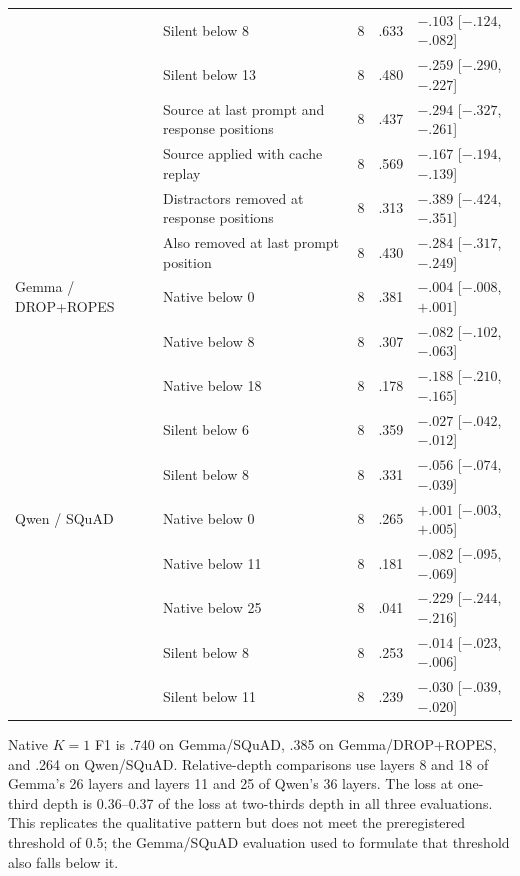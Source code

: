 \begin{table}[t]
\begin{tabular}{@{}llrrl@{}}
& Silent below 8 & 8 & .633 & $-.103$ [$-.124$, $-.082$] \\
& Silent below 13 & 8 & .480 & $-.259$ [$-.290$, $-.227$] \\
& Source at last prompt and response positions & 8 & .437 & $-.294$ [$-.327$, $-.261$] \\
& Source applied with cache replay & 8 & .569 & $-.167$ [$-.194$, $-.139$] \\
& Distractors removed at response positions & 8 & .313 & $-.389$ [$-.424$, $-.351$] \\
& Also removed at last prompt position & 8 & .430 & $-.284$ [$-.317$, $-.249$] \\
\midrule
Gemma / DROP+ROPES & Native below 0 & 8 & .381 & $-.004$ [$-.008$, $+.001$] \\
& Native below 8 & 8 & .307 & $-.082$ [$-.102$, $-.063$] \\
& Native below 18 & 8 & .178 & $-.188$ [$-.210$, $-.165$] \\
& Silent below 6 & 8 & .359 & $-.027$ [$-.042$, $-.012$] \\
& Silent below 8 & 8 & .331 & $-.056$ [$-.074$, $-.039$] \\
\midrule
Qwen / SQuAD & Native below 0 & 8 & .265 & $+.001$ [$-.003$, $+.005$] \\
& Native below 11 & 8 & .181 & $-.082$ [$-.095$, $-.069$] \\
& Native below 25 & 8 & .041 & $-.229$ [$-.244$, $-.216$] \\
& Silent below 8 & 8 & .253 & $-.014$ [$-.023$, $-.006$] \\
& Silent below 11 & 8 & .239 & $-.030$ [$-.039$, $-.020$] \\
\bottomrule
\end{tabular}
\end{table}

Native $K=1$ F1 is .740 on Gemma/SQuAD, .385 on Gemma/DROP+ROPES,
and .264 on Qwen/SQuAD. Relative-depth comparisons use layers 8 and 18
of Gemma's 26 layers and layers 11 and 25 of Qwen's 36 layers.
The loss at one-third depth is 0.36--0.37 of the loss at two-thirds depth
in all three evaluations. This replicates the qualitative pattern but does
not meet the preregistered threshold of 0.5; the Gemma/SQuAD evaluation
used to formulate that threshold also falls below it.
